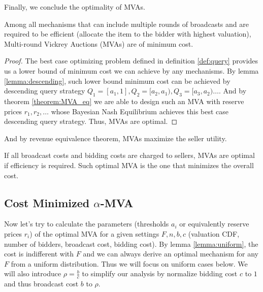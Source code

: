 Finally, we conclude the optimality of MVAs.

\begin{theorem}\label{theorem:MVA_eq}

Among all mechanisms that can include multiple rounds of broadcasts and are
required to be efficient (allocate the item to the bidder with highest
valuation), Multi-round Vickrey Auctions (MVAs) are of minimum cost.

\end{theorem}

\begin{proof}

The best case optimizing problem defined in definition \ref{def:query} provides
us a lower bound of minimum cost we can achieve by any mechanisms.  By lemma
\ref{lemma:descending}, such lower bound minimum cost can be achieved by
descending query strategy $Q_1 = [a_1, 1], Q_2 = [a_2, a_1), Q_3 = [a_3, a_2)
\ldots$.  And by theorem \ref{theorem:MVA_eq} we are able to design such an MVA
with reserve prices $r_1, r_2, \ldots$  whose Bayesian Nash Equilibrium
achieves this best case descending query strategy.  Thus, MVAs are optimal.

\end{proof}

And by revenue equivalence theorem, MVAs maximize the seller utility.

\begin{corollary}

If all broadcast costs and bidding costs are charged to sellers, MVAs are
optimal if efficiency is required.  Such optimal MVA is the one that minimizes
the overall cost.

\end{corollary}

\subsection{Cost Minimized $\alpha$-MVA}\label{sec:alpha-MVA}

Now let's try to calculate the parameters (thresholds $a_i$ or equivalently
reserve prices $r_i$) of the optimal MVA for a given settings $F, n, b, c$
(valuation CDF, number of bidders, broadcast cost, bidding cost). By lemma
\ref{lemma:uniform}, the cost is indifferent with $F$ and we can always derive
an optimal mechanism for any $F$ from a uniform distribution. Thus we will
focus on uniform cases below. We will also introduce $\rho = \frac{b}{c}$ to
simplify our analysis by normalize bidding cost $c$ to $1$ and thus broadcast
cost $b$ to $\rho$.

